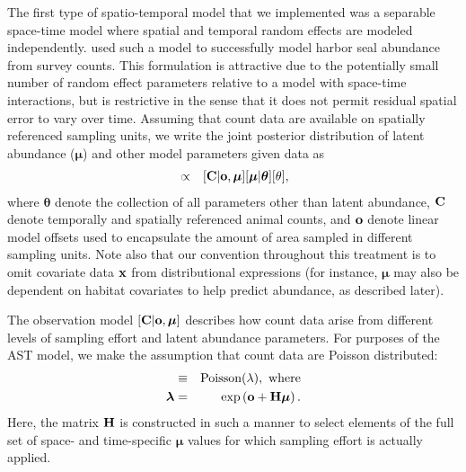 \documentclass[12pt,fleqn]{article}
\begin{document}
\begin{flushleft}
The first type of spatio-temporal model that we implemented was a separable space-time model where spatial and temporal random effects are modeled independently.  \citet{VerHoefJansen2007} used such a model to successfully model harbor seal abundance from survey counts.  This formulation is attractive due to the potentially small number of random effect parameters relative to a model with space-time interactions, but is restrictive in the sense that it does not permit residual spatial error to vary over time.  Assuming that count data are available on spatially referenced sampling units, we write the joint posterior distribution of latent abundance ($\boldsymbol{\mu}$) and other model parameters given data as
\begin{eqnarray}
  [\boldsymbol{\mu},\boldsymbol{\theta} | {\bf C},{\bf o}] & \propto & [{\bf C} | {\bf o}, \boldsymbol{\mu}] [\boldsymbol{\mu} | \boldsymbol{\theta}] [\theta],
  \label{eq:hmod}
\end{eqnarray}
where $\boldsymbol{\theta}$ denote the collection of all parameters other than latent abundance, ${\bf C}$ denote temporally and spatially referenced animal counts, and ${\bf o}$ denote linear model offsets used to encapsulate the amount of area sampled in different sampling units.  Note also that our convention throughout this treatment is to omit covariate data ${\bf x}$ from distributional expressions (for instance, $\boldsymbol{\mu}$ may also be dependent on habitat covariates to help predict abundance, as described later).

\hspace{.5in} The observation model $[{\bf C} | {\bf o}, \boldsymbol{\mu}]$ describes how count data arise from different levels of sampling effort and latent abundance parameters.  For purposes of the AST model, we make the assumption that count data are Poisson distributed:
\begin{eqnarray}
  [{\bf C} | {\bf o}, \boldsymbol{\mu}] & \equiv & \textrm{Poisson}({\bf \lambda}), \textrm{ where} \nonumber \\
  \boldsymbol{\lambda} & = & \exp \left( {\bf o} + {\bf H}\boldsymbol{\mu} \right).
  \label{eq:cmod}
\end{eqnarray}
Here, the matrix ${\bf H}$ is constructed in such a manner to select elements of the full set of space- and time-specific $\boldsymbol{\mu}$ values for which sampling effort is actually applied.


\end{flushleft}
\end{document}
